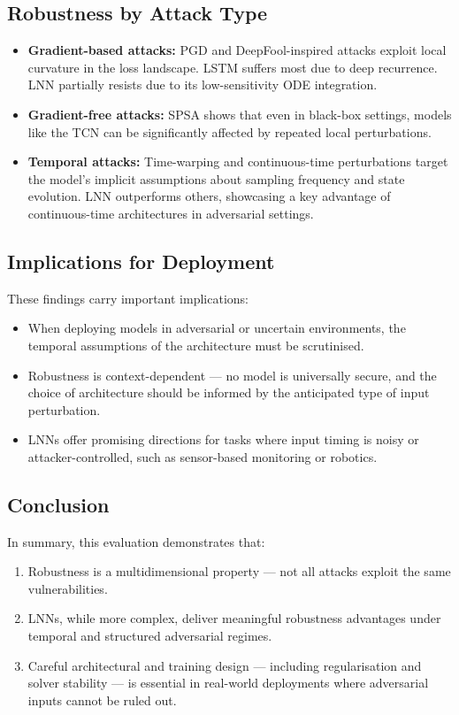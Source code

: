 \subsection{Robustness by Attack Type}

\begin{itemize}
    \item \textbf{Gradient-based attacks:} PGD and DeepFool-inspired attacks exploit local curvature in the loss landscape. LSTM suffers most due to deep recurrence. LNN partially resists due to its low-sensitivity ODE integration.
    \item \textbf{Gradient-free attacks:} SPSA shows that even in black-box settings, models like the TCN can be significantly affected by repeated local perturbations.
    \item \textbf{Temporal attacks:} Time-warping and continuous-time perturbations target the model's implicit assumptions about sampling frequency and state evolution. LNN outperforms others, showcasing a key advantage of continuous-time architectures in adversarial settings.
\end{itemize}

\subsection{Implications for Deployment}

These findings carry important implications:
\begin{itemize}
    \item When deploying models in adversarial or uncertain environments, the temporal assumptions of the architecture must be scrutinised.
    \item Robustness is context-dependent — no model is universally secure, and the choice of architecture should be informed by the anticipated type of input perturbation.
    \item LNNs offer promising directions for tasks where input timing is noisy or attacker-controlled, such as sensor-based monitoring or robotics.
\end{itemize}

\subsection{Conclusion}

In summary, this evaluation demonstrates that:
\begin{enumerate}
    \item Robustness is a multidimensional property — not all attacks exploit the same vulnerabilities.
    \item LNNs, while more complex, deliver meaningful robustness advantages under temporal and structured adversarial regimes.
    \item Careful architectural and training design — including regularisation and solver stability — is essential in real-world deployments where adversarial inputs cannot be ruled out.
\end{enumerate}
